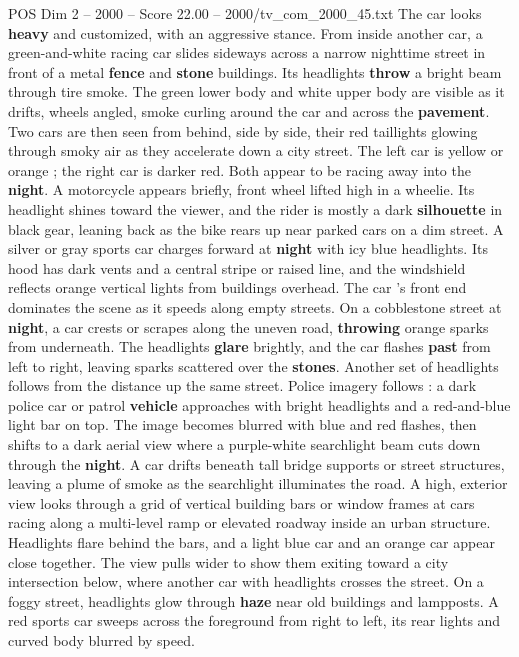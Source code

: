 \begin{textsample}{POS Dim 2 – 2000 – Score 22.00 – 2000/tv\_com\_2000\_45.txt}
The car looks \textbf{heavy} and customized, with an aggressive stance.
From inside another car, a green-and-white racing car slides sideways across a narrow nighttime street in front of a metal \textbf{fence} and \textbf{stone} buildings.
Its headlights \textbf{throw} a bright beam through tire smoke.
The green lower body and white upper body are visible as it drifts, wheels angled, smoke curling around the car and across the \textbf{pavement}.
Two cars are then seen from behind, side by side, their red taillights glowing through smoky air as they accelerate down a city street.
The left car is yellow or orange ; the right car is darker red.
Both appear to be racing away into the \textbf{night}.
A motorcycle appears briefly, front wheel lifted high in a wheelie.
Its headlight shines toward the viewer, and the rider is mostly a dark \textbf{silhouette} in black gear, leaning back as the bike rears up near parked cars on a dim street.
A silver or gray sports car charges forward at \textbf{night} with icy blue headlights.
Its hood has dark vents and a central stripe or raised line, and the windshield reflects orange vertical lights from buildings overhead.
The car ’s front end dominates the scene as it speeds along empty streets.
On a cobblestone street at \textbf{night}, a car crests or scrapes along the uneven road, \textbf{throwing} orange sparks from underneath.
The headlights \textbf{glare} brightly, and the car flashes \textbf{past} from left to right, leaving sparks scattered over the \textbf{stones}.
Another set of headlights follows from the distance up the same street.
Police imagery follows : a dark police car or patrol \textbf{vehicle} approaches with bright headlights and a red-and-blue light bar on top.
The image becomes blurred with blue and red flashes, then shifts to a dark aerial view where a purple-white searchlight beam cuts down through the \textbf{night}.
A car drifts beneath tall bridge supports or street structures, leaving a plume of smoke as the searchlight illuminates the road.
A high, exterior view looks through a grid of vertical building bars or window frames at cars racing along a multi-level ramp or elevated roadway inside an urban structure.
Headlights flare behind the bars, and a light blue car and an orange car appear close together.
The view pulls wider to show them exiting toward a city intersection below, where another car with headlights crosses the street.
On a foggy street, headlights glow through \textbf{haze} near old buildings and lampposts.
A red sports car sweeps across the foreground from right to left, its rear lights and curved body blurred by speed.

\end{textsample}
